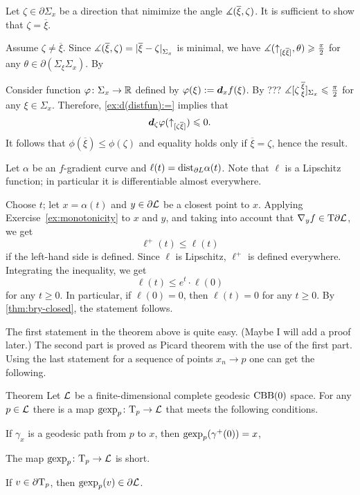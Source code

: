 Let $\zeta\in \partial\Sigma_x$ be a direction that nimimize the angle $\measuredangle(\overline{\xi},\zeta)$.
It is sufficient to show that $\zeta=\overline{\xi}$.

Assume $\zeta\ne \overline{\xi}$.
Since $\mangle(\overline{\xi},\zeta)=\dist{\overline{\xi}}{\zeta}{\Sigma_x}$
is minimal, we have
$\measuredangle({\uparrow}_{[{\xi}{\overline{\xi}}]},\theta)\geqslant \tfrac\pi2$
for any $\theta\in\partial(\Sigma_\xi\Sigma_x)$.
By 

 
Consider function $\varphi\colon\Sigma_x\to\mathbb{R}$ defined by $\varphi(\xi)\mathrel{:=}\bm{d}_xf(\xi)$.
By ??? $\measuredangle [\zeta\,{}^{\overline{\xi}}_{\xi}]_{\Sigma_x}\leqslant \tfrac\pi 2$ for any $\xi\in\Sigma_x$.
Therefore, \ref{ex:d(distfun):=} implies that 
\[\bm{d}_\zeta\varphi({\uparrow}_{[{\zeta}{\overline{\xi}}]})\leqslant 0.\]
It follows that $\phi(\overline{\xi})\le \phi(\zeta)$ and equality holds only if $\overline{\xi}=\zeta$,
hence the result.

Let $\alpha$ be an $f$-gradient curve and $\ell(t)=\mathrm{dist}_{\partial L}\alpha(t)$.
Note that $\ell$ is a Lipschitz function;
in particular it is differentiable almost everywhere.

Choose $t$;
let $x=\alpha(t)$ and $y\in \partial\mathcal{L}$ be a closest point to $x$.
Applying Exercise~\ref{ex:monotonicity} to $x$ and $y$, 
and taking into account that $\nabla_yf\in \mathrm{T}\partial\mathcal{L}$, 
we get
\[\ell^+(t)\le \ell(t)\]
if the left-hand side is defined.
Since $\ell$ is Lipschitz, $\ell^+$ is defined everywhere.
Integrating the inequality, we get 
\[\ell(t)\le e^t\cdot\ell(0)\]
for any $t\ge 0$.
In particular, if $\ell(0)=0$, then $\ell(t)=0$ for any $t\ge 0$.
By \ref{thm:bry-closed}, the statement follows.
\qeds

The first statement in the theorem above is quite easy.
(Maybe I will add a proof later.)
The second part is proved as Picard theorem with the use of the first part.
Using the last statement for a sequence of points $x_n\to p$ one can get the following.

\begin{thm}{Theorem}\label{thm:gexp}
Let $\mathcal{L}$ be a finite-dimensional complete geodesic $\mathrm{CBB}(0)$ space.
For any $p\in \mathcal{L}$ there is a map $\operatorname{\rm gexp}\nolimits_p\colon\mathrm{T}_p\to \mathcal{L}$  that meets the following conditions.

\begin{subthm}{}
If $\gamma_x$ is a geodesic path from $p$ to $x$, then $\operatorname{\rm gexp}\nolimits_p(\gamma^+(0))=x$, 
\end{subthm}

\begin{subthm}{}
The map $\operatorname{\rm gexp}\nolimits_p\colon\mathrm{T}_p\to \mathcal{L}$ is short.
\end{subthm}

\begin{subthm}{}
If $v\in \partial\mathrm{T}_p$, then $\operatorname{\rm gexp}\nolimits_p(v)\in \partial  \mathcal{L}$.
\end{subthm}

\end{thm}

